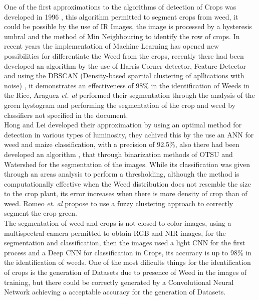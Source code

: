 \documentclass[conference]{IEEEtran}
\begin{document}
One of the first approximations to the algorithms of detection of Crops was  developed in 1996 \cite{brivot1996segmentation}, this algorithm permitted to segment crops from weed, it could be possible by the use of IR Images, the image is processed by a hysteresis umbral and the method of Min Neighbouring to identify the row of crops. In recent years the implementation of Machine Learning has opened new possibilities for differentiate the Weed from the crops, recently \cite{cheng2015feature} there had been developed an algorithm by the use of Harris Corner detector, Feature Detector and using the DBSCAN (Density-based spartial clustering of apllications with noise) , it demonstrates an effectiveness of  98\% in the identification of Weeds in the Rice, Araguez \textit{et. al} \cite{equipo2006proceedings}  performed their segmentation through the analysis of the green hystogram and performing the segmentation of the crop and weed by classifiers not specified in the document. 
\\

Hong and Lei \cite{jeon2011robust} developed their approximation by using an optimal method for detection in various types of luminosity, they achived this by the use an ANN for weed and maize classification, with a precision of 92.5\%,  also there had been developed an algorithm \cite{hlaing2014weed}, that through binarization methods of OTSU and Watershed for the segmentation of the images. While its classification was given through an areas analysis to perform a thresholding, although the method is computationally effective when the Weed distribution does not resemble the size to the crop plant, its error increases when there is more density of crop than of weed. Romeo \textit{et. al} \cite{romeo2012crop} propose to use a fuzzy clustering approach to correctly segment the crop green.
\\

The segmentation of weed and crops is not closed to color images, using a multispectral camera  \cite{potena2016fast} permitted to obtain RGB and NIR images, for the segmentation and classification, then the images used a light CNN for the first process and a Deep CNN for classification in Crops, its accuracy is up to 98\% in the identification of weeds. One of the most dificults things for the identification of crops is the generation of Datasets due to presence of Weed in the images of training, but there could be correctly generated by a Convolutional Neural Network \cite{di2016automatic} achieving a acceptable accuracy for the generation of Datasets. 
\\
\end{document}
